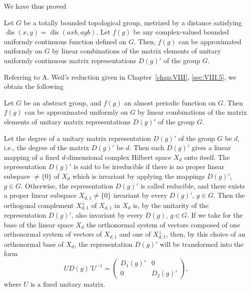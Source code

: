 We have thus proved 

\begin{theorem}\label{thm:XI.10.Theorem.2} Let $G$ be a totally bounded topological group, metrized by a distance satisfying $\text{ dis }(x, y) = \text{ dis }(axb, ayb)$. Let $f(g)$ be any complex-valued bounded uniformly continuous function defined on $G$. Then, $f(g)$ can be approximated uniformly on $G$ by linear combinations of the matrix elements of unitary uniformly continuous matrix representations $D(g)'$ of the group $G$. 
\end{theorem}

Referring to A. Weil's reduction given in Chapter~\ref{chap:VIII}, \ref{sec:VIII.5}, we obtain the following 

\begin{corollaryu} Let $G$ be an abstract group, and $f(g)$ an almost periodic function on $G$. Then $f(g)$ can be approximated uniformly on $G$ by linear combinations of the matrix elements of unitary matrix representations $D(g)'$ of the group $G$. 
\end{corollaryu}

\begin{remarkn}[Remark $1$] Let the degree of a unitary matrix representation $D(g)'$ of the group $G$ be $d$, i.e., the degree of the matrix $D(g)'$ be $d$. Then each $D(g)'$ gives a linear mapping of a fixed $d$-dimensional complex Hilbert space $X_d$ onto itself. The representation $D(g)'$ is said to be irreducible if there is no proper linear subspace $\neq \{0\}$ of $X_d$ which is invariant by applying the mappings $D(g)'$, $g \in G$. Otherwise, the representation 
$D(g)'$ is called reducible, and there exists a proper linear subspace $X_{d,1} \neq \{0\}$ invariant by every $D(g)'$, $g \in G$. Then the orthogonal complement $X_{d,1}^{\perp}$ of $X_{d,1}$ in $X_d$ is, by the unitarity of the representation $D(g)'$, also invariant by every $D(g)$, $g \in G$. If we take for the base of the linear space $X_d$ the orthonormal system of vectors composed of one orthonormal system of vectors of $X_{d,1}$ and one of $X_{d,1}^{\perp}$, then, by this choice of an orthonormal base of $X_d$, the representation $D(g)'$ will be transformed into the form 
\[
UD(g)'U^{-1}=\begin{pmatrix}D_1(g)'&0\\0&D_2(g)'\end{pmatrix},
\]
where $U$ is a fixed unitary matrix.
\end{remarkn}

